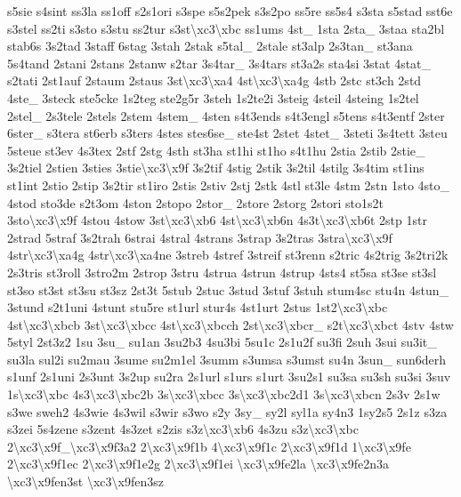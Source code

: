{s5sie s4sint ss3la ss1off s2s1ori s3spe s5s2pek s3s2po ss5re ss5s4 s3sta s5stad sst6e s3stel ss2ti s3sto s3stu ss2tur s3st\textbackslash{}xc3\textbackslash{}xbc ss1ums 4st\-\_\- 1sta 2sta\-\_\- 3staa sta2bl stab6s 3s2tad 3staff 6stag 3stah 2stak s5tal\-\_\- 2stale st3alp 2s3tan\-\_\- st3ana 5s4tand 2stani 2stans 2stanw s2tar 3s4tar\-\_\- 3s4tars st3a2s sta4si 3stat 4stat\-\_\- s2tati 2st1auf 2staum 2staus 3st\textbackslash{}xc3\textbackslash{}xa4 4st\textbackslash{}xc3\textbackslash{}xa4g 4stb 2stc st3ch 2std 4ste\-\_\- 3steck ste5cke 1s2teg ste2g5r 3steh 1s2te2i 3steig 4steil 4steing 1s2tel 2stel\-\_\- 2s3tele 2stels 2stem 4stem\-\_\- 4sten s4t3ends s4t3engl s5tens s4t3entf 2ster 6ster\-\_\- s3tera st6erb s3ters 4stes stes6se\-\_\- ste4st 2stet 4stet\-\_\- 3steti 3s4tett 3steu 5steue st3ev 4s3tex 2stf 2stg 4sth st3ha st1hi st1ho s4t1hu 2stia 2stib 2stie\-\_\- 3s2tiel 2stien 3sties 3stie\textbackslash{}xc3\textbackslash{}x9f 3s2tif 4stig 2stik 3s2til 4stilg 3s4tim st1ins st1int 2stio 2stip 3s2tir st1iro 2stis 2stiv 2stj 2stk 4stl st3le 4stm 2stn 1sto 4sto\-\_\- 4stod sto3de s2t3om 4ston 2stopo 2stor\-\_\- 2store 2storg 2stori sto1s2t 3sto\textbackslash{}xc3\textbackslash{}x9f 4stou 4stow 3st\textbackslash{}xc3\textbackslash{}xb6 4st\textbackslash{}xc3\textbackslash{}xb6n 4s3t\textbackslash{}xc3\textbackslash{}xb6t 2stp 1str 2strad 5straf 3s2trah 6strai 4stral 4strans 3strap 3s2tras 3stra\textbackslash{}xc3\textbackslash{}x9f 4str\textbackslash{}xc3\textbackslash{}xa4g 4str\textbackslash{}xc3\textbackslash{}xa4ne 3streb 4stref 3streif st3renn s2tric 4s2trig 3s2tri2k 2s3tris st3roll 3stro2m 2strop 3stru 4strua 4strun 4strup 4sts4 st5sa st3se st3sl st3so st3st st3su st3sz 2st3t 5stub 2stuc 3stud 3stuf 3stuh stum4sc stu4n 4stun\-\_\- 3stund s2t1uni 4stunt stu5re st1url stur4s 4st1urt 2stus 1st2\textbackslash{}xc3\textbackslash{}xbc 4st\textbackslash{}xc3\textbackslash{}xbcb 3st\textbackslash{}xc3\textbackslash{}xbcc 4st\textbackslash{}xc3\textbackslash{}xbcch 2st\textbackslash{}xc3\textbackslash{}xbcr\-\_\- s2t\textbackslash{}xc3\textbackslash{}xbct 4stv 4stw 5styl 2st3z2 1su 3su\-\_\- su1an 3su2b3 4su3bi 5su1c 2s1u2f su3fi 2suh 3sui su3it\-\_\- su3la sul2i su2mau 3sume su2m1el 3summ s3umsa s3umst su4n 3sun\-\_\- sun6derh s1unf 2s1uni 2s3unt 3s2up su2ra 2s1url s1urs s1urt 3su2s1 su3sa su3sh su3si 3suv 1s\textbackslash{}xc3\textbackslash{}xbc 4s3\textbackslash{}xc3\textbackslash{}xbc2b 3s\textbackslash{}xc3\textbackslash{}xbcc 3s\textbackslash{}xc3\textbackslash{}xbc2d1 3s\textbackslash{}xc3\textbackslash{}xbcn 2s3v 2s1w s3we sweh2 4s3wie 4s3wil s3wir s3wo s2y 3sy\-\_\- sy2l syl1a sy4n3 1sy2s5 2s1z s3za s3zei 5s4zene s3zent 4s3zet s2zis s3z\textbackslash{}xc3\textbackslash{}xb6 4s3zu s3z\textbackslash{}xc3\textbackslash{}xbc 2\textbackslash{}xc3\textbackslash{}x9f\-\_\textbackslash{}xc3\textbackslash{}x9f3a2 2\textbackslash{}xc3\textbackslash{}x9f1b 4\textbackslash{}xc3\textbackslash{}x9f1c 2\textbackslash{}xc3\textbackslash{}x9f1d 1\textbackslash{}xc3\textbackslash{}x9fe 2\textbackslash{}xc3\textbackslash{}x9f1ec 2\textbackslash{}xc3\textbackslash{}x9f1e2g 2\textbackslash{}xc3\textbackslash{}x9f1ei \textbackslash{}xc3\textbackslash{}x9fe2la \textbackslash{}xc3\textbackslash{}x9fe2n3a \textbackslash{}xc3\textbackslash{}x9fen3st \textbackslash{}xc3\textbackslash{}x9fen3sz }
